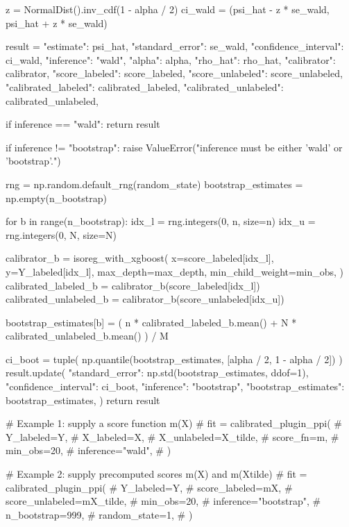 \documentclass{article}
\theoremstyle{plain}
\theoremstyle{definition}
\newcommand{\1}{\mathbbm{1}}
\begin{document}
\begin{codeblock}
    z = NormalDist().inv_cdf(1 - alpha / 2)
    ci_wald = (psi_hat - z * se_wald, psi_hat + z * se_wald)

    result = {
        "estimate": psi_hat,
        "standard_error": se_wald,
        "confidence_interval": ci_wald,
        "inference": "wald",
        "alpha": alpha,
        "rho_hat": rho_hat,
        "calibrator": calibrator,
        "score_labeled": score_labeled,
        "score_unlabeled": score_unlabeled,
        "calibrated_labeled": calibrated_labeled,
        "calibrated_unlabeled": calibrated_unlabeled,
    }

    if inference == "wald":
        return result

    if inference != "bootstrap":
        raise ValueError("inference must be either 'wald' or 'bootstrap'.")

    rng = np.random.default_rng(random_state)
    bootstrap_estimates = np.empty(n_bootstrap)

    for b in range(n_bootstrap):
        idx_l = rng.integers(0, n, size=n)
        idx_u = rng.integers(0, N, size=N)

        calibrator_b = isoreg_with_xgboost(
            x=score_labeled[idx_l],
            y=Y_labeled[idx_l],
            max_depth=max_depth,
            min_child_weight=min_obs,
        )
        calibrated_labeled_b = calibrator_b(score_labeled[idx_l])
        calibrated_unlabeled_b = calibrator_b(score_unlabeled[idx_u])

        bootstrap_estimates[b] = (
            n * calibrated_labeled_b.mean() + N * calibrated_unlabeled_b.mean()
        ) / M

    ci_boot = tuple(
        np.quantile(bootstrap_estimates, [alpha / 2, 1 - alpha / 2])
    )
    result.update(
        {
            "standard_error": np.std(bootstrap_estimates, ddof=1),
            "confidence_interval": ci_boot,
            "inference": "bootstrap",
            "bootstrap_estimates": bootstrap_estimates,
        }
    )
    return result


# Example 1: supply a score function m(X)
# fit = calibrated_plugin_ppi(
#     Y_labeled=Y,
#     X_labeled=X,
#     X_unlabeled=X_tilde,
#     score_fn=m,
#     min_obs=20,
#     inference="wald",
# )

# Example 2: supply precomputed scores m(X) and m(Xtilde)
# fit = calibrated_plugin_ppi(
#     Y_labeled=Y,
#     score_labeled=mX,
#     score_unlabeled=mX_tilde,
#     min_obs=20,
#     inference="bootstrap",
#     n_bootstrap=999,
#     random_state=1,
# )
\end{codeblock}
\end{document}
